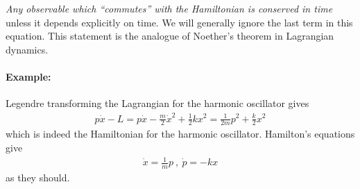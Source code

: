\documentclass[12pt]{article}
\begin{document}
{\em Any observable which ``commutes'' with the Hamiltonian is conserved in time} \\
unless it depends explicitly on time. We will generally ignore the last term in this equation. This statement is the analogue of Noether's theorem in Lagrangian dynamics. 


\paragraph{Example:} Legendre transforming the Lagrangian for the harmonic oscillator gives
\begin{eqnarray}
p\dot x-L=p\dot x-\frac m2 \dot x^2+\frac 12 kx^2=\frac 1{2m}p^2+\frac k2 x^2
\end{eqnarray}
which is indeed the Hamiltonian for the harmonic oscillator. Hamilton's equations give 
\begin{eqnarray}
\dot x=\frac 1{m} p~,~\dot p=-k x
\end{eqnarray}
as they should. 
\end{document}
